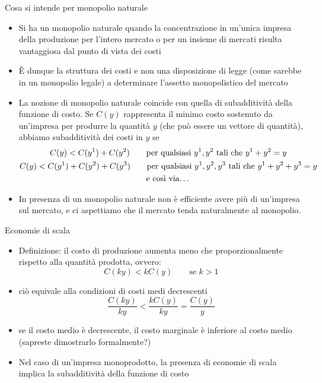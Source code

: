 \documentclass[aspectratio=149,11pt]{beamer}
\begin{document}
\begin{frame}{Cosa si intende per monopolio naturale}
\begin{itemize}
\item Si ha un monopolio naturale quando la concentrazione in un'unica impresa
della produzione per l'intero mercato o per un insieme di mercati risulta
vantaggiosa dal punto di vista dei costi
\item È dunque la struttura dei costi e non una disposizione di legge (come
sarebbe in un monopolio \alert{legale}) a determinare l'assetto monopolistico del
mercato
\item La nozione di monopolio naturale coincide con quella di
\alert{subadditività della funzione di costo}. Se $C(y)$ rappresenta il \alert{minimo}
costo sostenuto da un'impresa per produrre la quantità $y$ (che può essere
un vettore di quantità), abbiamo subadditività dei costi in $y$ se
\begin{gather*}
 C(y) < C(y^1)+C(y^2) \qquad\text{per qualsiasi $y^1,y^2$ tali che $y^1+y^2=y$}\\
 C(y) < C(y^1)+C(y^2)+C(y^3) \qquad\text{per qualsiasi $y^1,y^2,y^3$ tali che $y^1+y^2+y^3=y$}\\
 \text{e così via\dots}
\end{gather*}
\item In presenza di un monopolio naturale \alert{non è efficiente} avere più di un'impresa
sul mercato, e ci aspettiamo che il mercato tenda naturalmente al \alert{monopolio}.
\end{itemize}
\end{frame}

\begin{frame}{Economie di scala}
\begin{itemize}
\item \alert{Definizione}: il costo di produzione aumenta meno che
proporzionalmente rispetto alla quantità prodotta, ovvero:
\begin{equation*}
 C(ky) < kC(y) \qquad\text{se }k>1
\end{equation*}
\item ciò equivale alla condizioni di \alert{costi medi decrescenti}
\begin{equation*}
\frac{C(ky)}{ky} < \frac{kC(y)}{ky} = \frac{C(y)}{y} 
\end{equation*}
\item se il costo medio è decrescente, \alert{il costo marginale è inferiore al costo
medio} (sapreste dimostrarlo formalmente?)
\item Nel caso di un'impresa monoprodotto, la presenza di economie di scala
implica la subadditività della funzione di costo
\end{itemize}
\end{frame}
\end{document}

